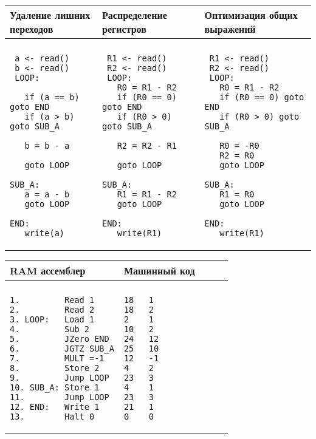 \documentclass[a4paper, 12pt]{extarticle}
\begin{document}
\noindent \begin{tabular}{lll}
 Удаление лишних переходов & Распределение регистров & Оптимизация общих выражений \\
 \hline 
 & & \\
\begin{minipage}{1.5in} 
\begin{verbatim}
 a <- read()
 b <- read() 
 LOOP:
 
   if (a == b) goto END
   if (a > b) goto SUB_A

   b = b - a
   
   goto LOOP
   
SUB_A:
   a = a - b
   goto LOOP  
       
END: 
   write(a)
\end{verbatim}
\end{minipage}
&
\begin{minipage}{\TabWidth} 
\begin{verbatim}
 R1 <- read()
 R2 <- read() 
 LOOP:
   R0 = R1 - R2
   if (R0 == 0) goto END
   if (R0 > 0) goto SUB_A

   R2 = R2 - R1
   
   goto LOOP
   
SUB_A:
   R1 = R1 - R2
   goto LOOP  
       
END: 
   write(R1)
\end{verbatim}
\end{minipage}
&
\begin{minipage}{\TabWidth} 
\begin{verbatim}
 R1 <- read()
 R2 <- read() 
 LOOP:
   R0 = R1 - R2
   if (R0 == 0) goto END
   if (R0 > 0) goto SUB_A

   R0 = -R0
   R2 = R0
   goto LOOP
   
SUB_A:
   R1 = R0
   goto LOOP  
       
END: 
   write(R1)
\end{verbatim}
\end{minipage}
\end{tabular}



\begin{tabular}{lll}
 RAM ассемблер & Машинный код \\
 \hline 
 &  \\
\begin{minipage}{\TabWidth} 
\begin{verbatim}
1.         Read 1
2.         Read 2
3. LOOP:   Load 1
4.         Sub 2
5.         JZero END
6.         JGTZ SUB_A
7.         MULT =-1
8.         Store 2
9.         Jump LOOP
10. SUB_A: Store 1
11.        Jump LOOP
12. END:   Write 1
13.        Halt 0
\end{verbatim}
\end{minipage}
&
\begin{minipage}{\TabWidth} 
\begin{verbatim}
18   1
18   2            
2    1      
10   2      
24   12     
25   10     
12   -1     
4    2      
23   3      
4    1      
23   3      
21   1      
0    0      
\end{verbatim}
\end{minipage}
\end{tabular}
\end{document}
